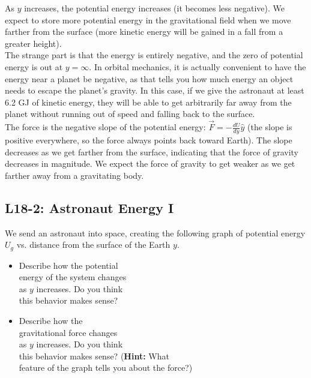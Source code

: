 \documentclass[]{article}
\newcommand{\Week}{18}
\begin{document}
\newpage
\begin{TeacherMargin}
\noindent As $y$ increases, the potential energy increases (it becomes less negative). We expect to store more potential energy in the gravitational field when we move farther from the surface (more kinetic energy will be gained in a fall from a greater height). \\

\noindent The strange part is that the energy is entirely negative, and the zero of potential energy is out at $y=\infty$. In orbital mechanics, it is actually convenient to have the energy near a planet be negative, as that tells you how much energy an object needs to escape the planet's gravity. In this case, if we give the astronaut at least 6.2 GJ of kinetic energy, they will be able to get arbitrarily far away from the planet without running out of speed and falling back to the surface. \\

\noindent The force is the negative slope of the potential energy: $\vec{F} = -\frac{dU}{dy}\hat{y}$ (the slope is positive everywhere, so the force always points back toward Earth). The slope decreases as we get farther from the surface, indicating that the force of gravity decreases in magnitude. We expect the force of gravity to get weaker as we get farther away from a gravitating body.
\end{TeacherMargin}
\begin{PresentSpace}
\vspace{-10pt}
\section*{L\Week-2: Astronaut Energy I}
\vspace{-5pt}
We send an astronaut into space, creating the following graph of potential energy $U_{g}$ vs. distance from the surface of the Earth $y$.
\begin{itemize}
	\item Describe how the potential \\
	energy of the system changes \\
	as $y$ increases. Do you think \\
	this behavior makes sense?
	\item Describe how the \\
	gravitational force changes \\
	as $y$ increases. Do you think \\
	this behavior makes sense? (\textbf{Hint:} What \\
	feature of the graph tells you about the force?)
\end{itemize}
\end{PresentSpace}
\end{document}
